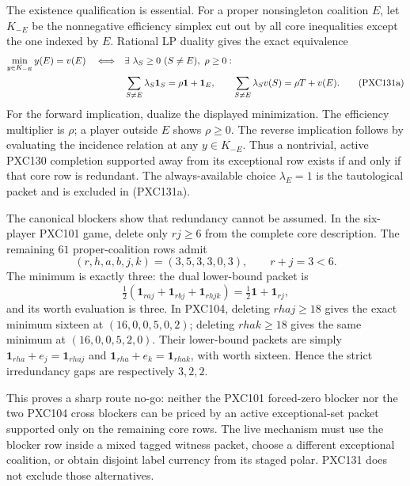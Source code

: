 \documentclass[11pt]{article}
\newcommand{\one}{\mathbf 1}
\begin{document}
The existence qualification is essential.  For a proper nonsingleton
coalition $E$, let $K_{-E}$ be the nonnegative efficiency simplex cut out by
all core inequalities except the one indexed by $E$.  Rational LP duality
gives the exact equivalence
\begin{align}
 \min_{y\in K_{-E}}y(E)=v(E)\quad\Longleftrightarrow\quad
 &\exists\ \lambda_S\ge0\ (S\ne E),\ \rho\ge0:\notag\\
 &\sum_{S\ne E}\lambda_S\one_S=\rho\one+\one_E,
 \qquad
 \sum_{S\ne E}\lambda_Sv(S)=\rho T+v(E).           \tag{PXC131a}
\end{align}
For the forward implication, dualize the displayed minimization.  The
efficiency multiplier is $\rho$; a player outside $E$ shows $\rho\ge0$.
The reverse implication follows by evaluating the incidence relation at any
$y\in K_{-E}$.  Thus a nontrivial, active PXC130 completion supported away
from its exceptional row exists if and only if that core row is redundant.
The always-available choice $\lambda_E=1$ is the tautological packet and is
excluded in (PXC131a).

The canonical blockers show that redundancy cannot be assumed.  In the
six-player PXC101 game, delete only $rj\ge6$ from the complete core
description.  The remaining $61$ proper-coalition rows admit
\[
                 (r,h,a,b,j,k)=(3,5,3,3,0,3),
                 \qquad r+j=3<6.                    \tag{PXC131b}
\]
The minimum is exactly three: the dual lower-bound packet is
\[
 \tfrac12(\one_{raj}+\one_{rbj}+\one_{rhjk})
       =\tfrac12\one+\one_{rj},
\]
and its worth evaluation is three.  In PXC104, deleting $rhaj\ge18$ gives
the exact minimum sixteen at $(16,0,0,5,0,2)$; deleting $rhak\ge18$ gives
the same minimum at $(16,0,0,5,2,0)$.  Their lower-bound packets are simply
$\one_{rha}+e_j=\one_{rhaj}$ and
$\one_{rha}+e_k=\one_{rhak}$, with worth sixteen.  Hence the strict
irredundancy gaps are respectively $3,2,2$.

This proves a sharp route no-go: neither the PXC101 forced-zero blocker nor
the two PXC104 cross blockers can be priced by an active exceptional-set
packet supported only on the remaining core rows.  The live mechanism must
use the blocker row inside a mixed tagged witness packet, choose a different
exceptional coalition, or obtain disjoint label currency from its staged
polar.  PXC131 does not exclude those alternatives.
\end{document}
